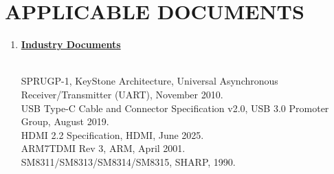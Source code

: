 \section{APPLICABLE DOCUMENTS}


\begin{enumerate}
	\item [(a)] \textbf{\underline{Industry Documents}}	
		\begin{slshape} \color{blue} \\
			SPRUGP-1, KeyStone Architecture, Universal Asynchronous Receiver/Transmitter (UART), November 2010. \\
			USB Type-C Cable and Connector Specification v2.0, USB 3.0 Promoter Group, August 2019. \\
			HDMI 2.2 Specification, HDMI, June 2025. \\
			ARM7TDMI Rev 3, ARM, April 2001. \\
			SM8311/SM8313/SM8314/SM8315, SHARP, 1990. \\
		\end{slshape}
\end{enumerate}

